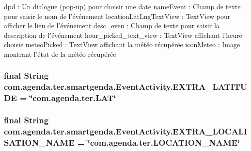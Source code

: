 dpd \-: Un dialogue (pop-\/up) pour choisir une date name\-Event \-: Champ de texte pour saisir le nom de l'événement location\-Lat\-Lng\-Text\-View \-: Text\-View pour afficher le lieu de l'événement desc\-\_\-even \-: Champ de texte pour saisir la description de l'événement hour\-\_\-picked\-\_\-text\-\_\-view \-: Text\-View affichant l'heure choisie meteo\-Picked \-: Text\-View affichant la météo récupérée icon\-Meteo \-: Image montrant l'état de la météo récupérée \hypertarget{classcom_1_1agenda_1_1ter_1_1smartgenda_1_1_event_activity_ae8f0b17af8c2dc56dce6026f9ffe472d}{
\subsubsection[{E\-X\-T\-R\-A\-\_\-\-L\-A\-T\-I\-T\-U\-D\-E}]{\setlength{\rightskip}{0pt plus 5cm}final String com.\-agenda.\-ter.\-smartgenda.\-Event\-Activity.\-E\-X\-T\-R\-A\-\_\-\-L\-A\-T\-I\-T\-U\-D\-E = \char`\"{}com.\-agenda.\-ter.\-L\-A\-T\char`\"{}\hspace{0.3cm}{\ttfamily [static]}}}\label{classcom_1_1agenda_1_1ter_1_1smartgenda_1_1_event_activity_ae8f0b17af8c2dc56dce6026f9ffe472d}
\hypertarget{classcom_1_1agenda_1_1ter_1_1smartgenda_1_1_event_activity_ae52ecdb7aabb645cd4ce5d0618e7000e}{
\subsubsection[{E\-X\-T\-R\-A\-\_\-\-L\-O\-C\-A\-L\-I\-S\-A\-T\-I\-O\-N\-\_\-\-N\-A\-M\-E}]{\setlength{\rightskip}{0pt plus 5cm}final String com.\-agenda.\-ter.\-smartgenda.\-Event\-Activity.\-E\-X\-T\-R\-A\-\_\-\-L\-O\-C\-A\-L\-I\-S\-A\-T\-I\-O\-N\-\_\-\-N\-A\-M\-E = \char`\"{}com.\-agenda.\-ter.\-L\-O\-C\-A\-T\-I\-O\-N\-\_\-\-N\-A\-M\-E\char`\"{}\hspace{0.3cm}{\ttfamily [static]}}}\label{classcom_1_1agenda_1_1ter_1_1smartgenda_1_1_event_activity_ae52ecdb7aabb645cd4ce5d0618e7000e}

